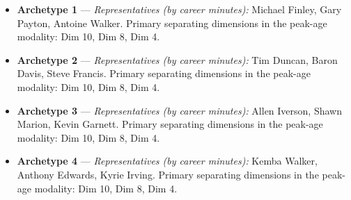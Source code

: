 \begin{itemize}
\item \textbf{Archetype 1} --- \emph{Representatives (by career minutes):} Michael Finley, Gary Payton, Antoine Walker. Primary separating dimensions in the peak-age modality: Dim 10, Dim 8, Dim 4.
\item \textbf{Archetype 2} --- \emph{Representatives (by career minutes):} Tim Duncan, Baron Davis, Steve Francis. Primary separating dimensions in the peak-age modality: Dim 10, Dim 8, Dim 4.
\item \textbf{Archetype 3} --- \emph{Representatives (by career minutes):} Allen Iverson, Shawn Marion, Kevin Garnett. Primary separating dimensions in the peak-age modality: Dim 10, Dim 8, Dim 4.
\item \textbf{Archetype 4} --- \emph{Representatives (by career minutes):} Kemba Walker, Anthony Edwards, Kyrie Irving. Primary separating dimensions in the peak-age modality: Dim 10, Dim 8, Dim 4.
\end{itemize}
